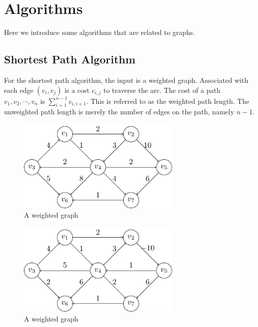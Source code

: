 \section{Algorithms}
Here we introduce some algorithms that are related to graphs.

\subsection{Shortest Path Algorithm}
For the shortest path algorithm, the input is a weighted graph. Associated with each edge \((v_i, v_j)\) is a cost \(c_{i, j}\) to traverse the arc. The cost of a path \(v_1, v_2, \cdots, v_n\) is \(\sum_{i = 1}^{n - 1} c_{i, i + 1}\). This is referred to as the weighted path length. The unweighted path length is merely the number of edges on the path, namely \(n - 1\).

\begin{minipage}{0.5\textwidth}
  \begin{figure}[H]
    \centering
    \includegraphics[width=0.7\textwidth]{Figure/shortest_path_algo.pdf}
    \caption{A weighted graph}
  \end{figure}
\end{minipage}\quad\quad
\begin{minipage}{0.5\textwidth}
  \begin{figure}[H]
    \centering
    \includegraphics[width=0.7\textwidth]{Figure/ng_weight_path.pdf}
    \caption{A weighted graph}
  \end{figure}
\end{minipage}\quad\quad

